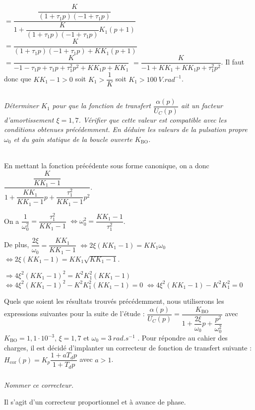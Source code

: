 \begin{multicols}{2}
\begin{corrige}
$=\dfrac{\dfrac{K}{(1+\tau_1p)(-1+ \tau_1p)}}{1+\dfrac{K}{(1+\tau_1p)(-1+ \tau_1p)} K_1(p+1) }$
$=\dfrac{K}{(1+\tau_1p)(-1+ \tau_1p)+K K_1(p+1) }$
$=\dfrac{K}{-1-\tau_1p+\tau_1p + \tau_1^2p^2+K K_1p+K K_1 }$
$=\dfrac{K}{-1+K K_1  +K K_1p + \tau_1^2p^2}$. Il faut donc que $KK_1 -1>0$ soit $K_1 >\dfrac{1}{K}$ soit $K_1>\SI{100}{V.rad^{-1}}$.
\end{corrige}
\else
\fi



\subparagraph{} \textit{Déterminer $K_1$ pour que la fonction de transfert $\dfrac{\alpha (p)}{U_C(p)}$
 ait un facteur d'amortissement $\xi=1,7$.
Vérifier que cette valeur est compatible avec les conditions obtenues précédemment. En déduire les
valeurs de la pulsation propre $\omega_0$ et du gain statique de la boucle ouverte $K_{\text{BO}}$.}
\ifprof
\begin{corrige}~\\

En mettant la fonction précédente sous forme canonique, on a donc $\dfrac{\dfrac{K}{K K_1-1}}{ 1 +\dfrac{K K_1}{K K_1-1}p + \dfrac{\tau_1^2}{K K_1-1}p^2}$.

On a $\dfrac{1}{\omega_0^2}= \dfrac{\tau_1^2}{K K_1-1}$ $\Leftrightarrow {\omega_0^2}= \dfrac{K K_1-1}{\tau_1^2}$. 

De plus, $\dfrac{2\xi}{\omega_0} = \dfrac{K K_1}{K K_1-1}$ $\Leftrightarrow 2\xi \left( K K_1-1 \right) = K K_1 \omega_0$  $\Leftrightarrow 2\xi \left( K K_1-1 \right) = K K_1 \sqrt{K K_1-1}$.

 $\Rightarrow 4\xi^2 \left( K K_1-1 \right)^2 = K^2 K_1^2 \left(K K_1-1\right)$
  $\Leftrightarrow 4\xi^2 \left( K K_1-1 \right)^2 - K^2 K_1^2 \left(K K_1-1\right)=0$
    $\Leftrightarrow 4\xi^2 \left( K K_1-1 \right) - K^2 K_1^2 =0$
\end{corrige}
\else
\fi

\ifprof
\else
Quels que soient les résultats trouvés précédemment, nous utiliserons les expressions suivantes pour la suite
de l'étude : $\dfrac{\alpha (p)}{U_C(p)} = \dfrac{K_{\text{BO}}}{1+\dfrac{2\xi}{\omega_0}p+\dfrac{p^2}{\omega_0^2}}$
avec $K_{\text{BO}}=1,1\cdot 10^{-3}$, $\xi=1,7$ et $\omega_0=\SI{3}{rad.s^{-1}}$ . Pour répondre au cahier des
charges, il est décidé d'implanter un correcteur de fonction de transfert suivante : $H_{\text{cor}} (p)=K_p \dfrac{1+aT_d p}{1+T_d p}$ avec $a>1$.

\fi

\subparagraph{} \textit{Nommer ce correcteur.}
\ifprof
\begin{corrige}
Il s'agit d'un correcteur proportionnel et à avance de phase. 
\end{corrige}
\else
\fi


\end{multicols}
